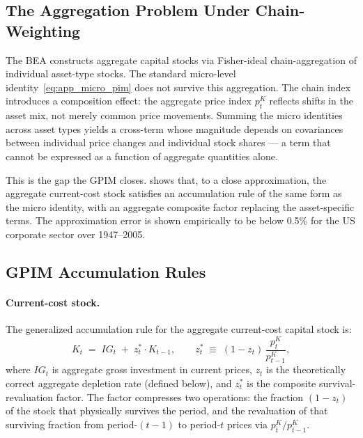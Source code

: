 \subsection{The Aggregation Problem Under Chain-Weighting}
\label{app:gpim_aggregation}

The BEA constructs aggregate capital stocks via Fisher-ideal
chain-aggregation of individual asset-type stocks. The standard
micro-level identity~\eqref{eq:app_micro_pim} does not survive this
aggregation. The chain index introduces a composition effect: the
aggregate price index $p_t^{K}$ reflects shifts in the asset mix, not
merely common price movements. Summing the micro identities across asset
types yields a cross-term whose magnitude depends on covariances between
individual price changes and individual stock shares --- a term that
cannot be expressed as a function of aggregate quantities alone.

This is the gap the GPIM closes. \citet[Appendix~6.5, \S V]{Shaikh2016}
shows that, to a close approximation, the aggregate current-cost stock
satisfies an accumulation rule of the same form as the micro identity,
with an aggregate composite factor replacing the asset-specific terms.
The approximation error is shown empirically to be below 0.5\% for the
US corporate sector over 1947--2005.


\subsection{GPIM Accumulation Rules}
\label{app:gpim_rules}

\paragraph{Current-cost stock.}
The generalized accumulation rule for the aggregate current-cost capital
stock is:
%
\begin{equation}
  \label{eq:app_gpim_nom}
  K_t \;=\; IG_t \;+\; z_t^{\ast}\cdot K_{t-1},
  \qquad
  z_t^{\ast} \;\equiv\; (1 - z_t)\,\frac{p_t^{K}}{p_{t-1}^{K}},
\end{equation}
%
where $IG_t$ is aggregate gross investment in current prices, $z_t$ is
the theoretically correct aggregate depletion rate (defined below), and
$z_t^{\ast}$ is the composite survival-revaluation factor. The factor
compresses two operations: the fraction $(1-z_t)$ of the stock that
physically survives the period, and the revaluation of that surviving
fraction from period-$(t-1)$ to period-$t$ prices via
$p_t^{K}/p_{t-1}^{K}$.

